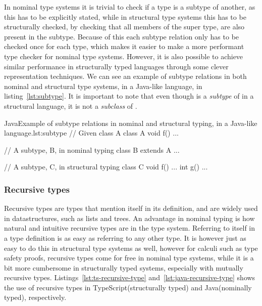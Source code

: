In nominal type systems it is trivial to check if a type is a subtype of another, as this has to be explicitly stated, while in structural type systems this has to be structurally checked, by checking that all members of the super type, are also present in the subtype.
Because of this each subtype relation only has to be checked once for each type, which makes it easier to make a more performant type checker for nominal type systems.
However, it is also possible to achieve similar performance in structurally typed languages through some clever representation techniques\cite{tapl}. %
We can see an example of subtype relations in both nominal and structural type systems, in a Java-like language, in listing~\vref{lst:subtype}.
It is important to note that even though  is a \emph{subtype} of  in a structural language, it is not a \emph{subclass} of .

\begin{code}{Java}{Example of subtype relations in nominal and structural typing, in a Java-like language.}{lst:subtype}
    // Given class A
    class A {
        void f() { ... }
     }

    // A subtype, B, in nominal typing
    class B extends A { ... }

    // A subtype, C, in structural typing
    class C {
        void f() { ... }
        int g() { ... }
    }
\end{code}

\subsubsection{Recursive types}\label{subsubsec:recursive-types}

Recursive types are types that mention itself in its definition, and are widely used in datastructures, such as lists and trees.
An advantage in nominal typing is how natural and intuitive recursive types are in the type system.
Referring to itself in a type definition is as easy as referring to any other type.
It is however just as easy to do this in structural type systems as well, however for calculi such as type safety proofs, recursive types come for free in nominal type systems, while it is a bit more cumbersome in structurally typed systems, especially with mutually recursive types\cite{tapl}.
Listings~\vref{lst:ts-recursive-type} and~\vref{lst:java-recursive-type} shows the use of recursive types in TypeScript(structurally typed) and Java(nominally typed), respectively.


